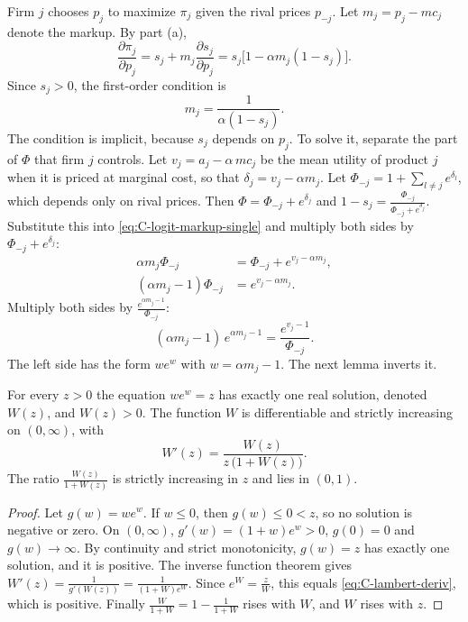 Firm $j$ chooses $p_j$ to maximize $\pi_j$ given the rival prices $p_{-j}$. Let $m_j = p_j - mc_j$ denote the
markup. By part (a),
\begin{equation}\label{eq:C-logit-dpi}
  \frac{\partial\pi_j}{\partial p_j} = s_j + m_j\frac{\partial s_j}{\partial p_j} = s_j\big[1 - \alpha m_j(1 - s_j)\big] .
\end{equation}
Since $s_j > 0$, the first-order condition is
\begin{equation}\label{eq:C-logit-markup-single}
  m_j = \frac{1}{\alpha(1 - s_j)} .
\end{equation}
The condition is implicit, because $s_j$ depends on $p_j$. To solve it, separate the part of $\Phi$ that firm $j$
controls. Let $v_j = a_j - \alpha\,mc_j$ be the mean utility of product $j$ when it is priced at marginal cost, so
that $\delta_j = v_j - \alpha m_j$. Let $\Phi_{-j} = 1 + \sum_{l \ne j}e^{\delta_l}$, which depends only on rival
prices. Then $\Phi = \Phi_{-j} + e^{\delta_j}$ and $1 - s_j = \frac{\Phi_{-j}}{\Phi_{-j} + e^{\delta_j}}$. Substitute this
into \eqref{eq:C-logit-markup-single} and multiply both sides by $\Phi_{-j} + e^{\delta_j}$:
\begin{align*}
  \alpha m_j\Phi_{-j} &= \Phi_{-j} + e^{v_j - \alpha m_j} , \\
  (\alpha m_j - 1)\Phi_{-j} &= e^{v_j - \alpha m_j} .
\end{align*}
Multiply both sides by $\frac{e^{\alpha m_j - 1}}{\Phi_{-j}}$:
\begin{equation}\label{eq:C-lambert-eq}
  (\alpha m_j - 1)\,e^{\alpha m_j - 1} = \frac{e^{v_j - 1}}{\Phi_{-j}} .
\end{equation}
The left side has the form $we^w$ with $w = \alpha m_j - 1$. The next lemma inverts it.

\begin{lemma}\label{lem:C-lambert}
For every $z > 0$ the equation $we^w = z$ has exactly one real solution, denoted $W(z)$, and $W(z) > 0$. The
function $W$ is differentiable and strictly increasing on $(0, \infty)$, with
\begin{equation}\label{eq:C-lambert-deriv}
  W'(z) = \frac{W(z)}{z\,\big(1 + W(z)\big)} .
\end{equation}
The ratio $\frac{W(z)}{1 + W(z)}$ is strictly increasing in $z$ and lies in $(0, 1)$.
\end{lemma}

\begin{proof}
Let $g(w) = we^w$. If $w \le 0$, then $g(w) \le 0 < z$, so no solution is negative or zero. On $(0, \infty)$,
$g'(w) = (1 + w)e^w > 0$, $g(0) = 0$ and $g(w) \to \infty$. By continuity and strict monotonicity, $g(w) = z$ has
exactly one solution, and it is positive. The inverse function theorem gives
$W'(z) = \frac{1}{g'(W(z))} = \frac{1}{(1 + W)e^W}$. Since $e^W = \frac{z}{W}$, this equals
\eqref{eq:C-lambert-deriv}, which is positive. Finally $\frac{W}{1 + W} = 1 - \frac{1}{1 + W}$ rises with $W$, and
$W$ rises with $z$.
\end{proof}

